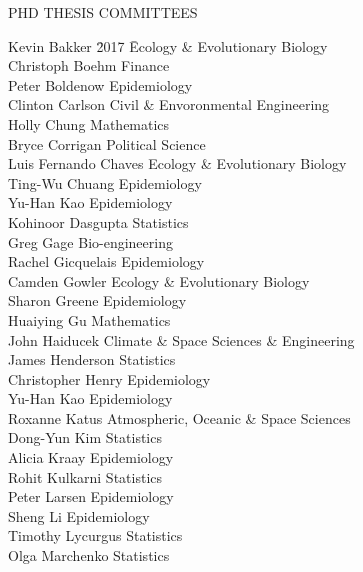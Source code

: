 \begin{mylist}{PHD THESIS COMMITTEES}

\item 
\begin{tabbing}
Kevin Bakker \hspace{2cm} \= 2017 \hspace{1cm} \= Ecology \& Evolutionary Biology\\
Christoph Boehm   \> Finance\\
Peter Boldenow  \> Epidemiology\\
Clinton Carlson  \> Civil \& Envoronmental Engineering\\
Holly Chung  \> Mathematics\\
Bryce Corrigan  \> Political Science\\
Luis Fernando Chaves  \> Ecology \& Evolutionary Biology\\
Ting-Wu Chuang  \> Epidemiology\\
Yu-Han Kao  \> Epidemiology\\
Kohinoor Dasgupta  \> Statistics \\
Greg Gage  \> Bio-engineering\\ 
Rachel Gicquelais  \> Epidemiology\\
Camden Gowler  \> Ecology \& Evolutionary Biology\\
Sharon Greene  \> Epidemiology\\ 
Huaiying Gu  \> Mathematics\\
John Haiducek \> Climate \& Space Sciences \& Engineering\\
James Henderson  \> Statistics\\
Christopher Henry  \> Epidemiology\\
Yu-Han Kao  \> Epidemiology\\
Roxanne Katus  \> Atmospheric, Oceanic \& Space Sciences\\
Dong-Yun Kim  \> Statistics\\
Alicia Kraay  \> Epidemiology\\
Rohit Kulkarni  \> Statistics\\
Peter Larsen  \> Epidemiology\\
Sheng Li  \>Epidemiology\\
Timothy Lycurgus  \> Statistics\\
Olga Marchenko  \> Statistics\\

\end{tabbing}
\end{mylist}
